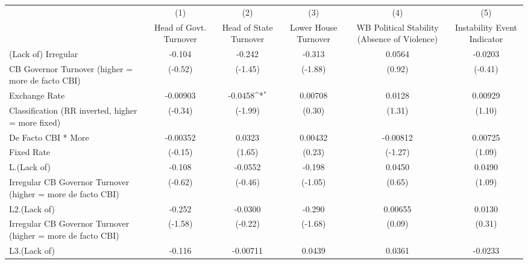 {
\def\sym#1{\ifmmode^{#1}\else\(^{#1}\)\fi}
\begin{tabular}{l*{5}{c}}
\hline\hline
                    &\multicolumn{1}{c}{(1)}&\multicolumn{1}{c}{(2)}&\multicolumn{1}{c}{(3)}&\multicolumn{1}{c}{(4)}&\multicolumn{1}{c}{(5)}\\
                    &\multicolumn{1}{c}{Head of Govt. Turnover}&\multicolumn{1}{c}{Head of State Turnover}&\multicolumn{1}{c}{Lower House Turnover}&\multicolumn{1}{c}{WB Political Stability (Absence of Violence)}&\multicolumn{1}{c}{Instability Event Indicator}\\
\hline
(Lack of) Irregular &      -0.104         &      -0.242         &      -0.313         &      0.0564         &     -0.0203         \\
CB Governor Turnover (higher = more de facto CBI)&     (-0.52)         &     (-1.45)         &     (-1.88)         &      (0.92)         &     (-0.41)         \\
[1em]
Exchange Rate       &    -0.00903         &     -0.0458\sym{*}  &     0.00708         &      0.0128         &     0.00929         \\
Classification (RR inverted, higher = more fixed)&     (-0.34)         &     (-1.99)         &      (0.30)         &      (1.31)         &      (1.10)         \\
[1em]
De Facto CBI * More &    -0.00352         &      0.0323         &     0.00432         &    -0.00812         &     0.00725         \\
Fixed Rate          &     (-0.15)         &      (1.65)         &      (0.23)         &     (-1.27)         &      (1.09)         \\
[1em]
L.(Lack of)         &      -0.108         &     -0.0552         &      -0.198         &      0.0450         &      0.0490         \\
Irregular CB Governor Turnover (higher = more de facto CBI)&     (-0.62)         &     (-0.46)         &     (-1.05)         &      (0.65)         &      (1.09)         \\
[1em]
L2.(Lack of)        &      -0.252         &     -0.0300         &      -0.290         &     0.00655         &      0.0130         \\
Irregular CB Governor Turnover (higher = more de facto CBI)&     (-1.58)         &     (-0.22)         &     (-1.68)         &      (0.09)         &      (0.31)         \\
[1em]
L3.(Lack of)        &      -0.116         &    -0.00711         &      0.0439         &      0.0361         &     -0.0233         \\

\end{tabular}}
